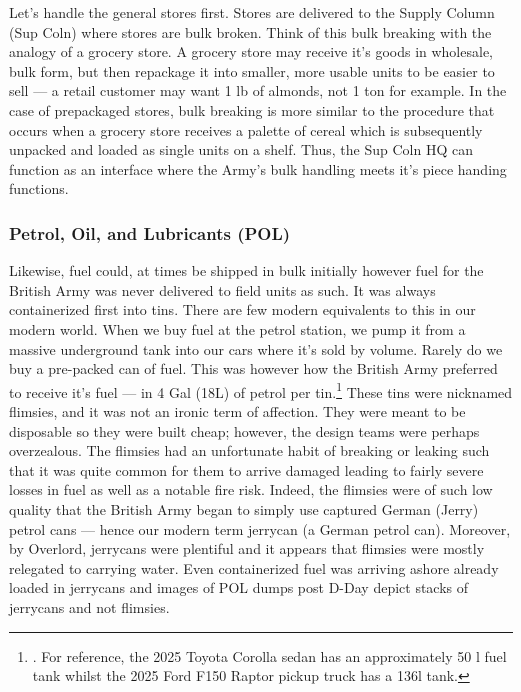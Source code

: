 \documentclass[noraggedright]{turabian-researchpaper}
\newcommand{\Petrol}{Precis of Lecture No. 12:  Petrol}
\newcommand{\SupInWar}{Precis on Lecture ``Supplies in War'', (Part II)}
\begin{document}
Let's handle the general stores first.  Stores are delivered to the Supply
Column (Sup Coln) where stores are bulk broken.  Think of this bulk breaking 
with the analogy of a grocery store.  A grocery store may receive it's goods in 
wholesale, bulk form, but then repackage it into smaller, more usable units to
be easier to sell --- a retail customer may want 1 lb of almonds, not 1 ton
for example.  In the case of prepackaged stores, bulk breaking is more similar
to the procedure that occurs when a grocery store receives a palette of cereal
which is subsequently unpacked and loaded as single units on a shelf.  Thus,
the Sup Coln HQ can function as an interface where the Army's bulk handling 
meets it's piece handing functions.\autocite[\SupInWar][3]{27course}

\subsubsection{Petrol, Oil, and Lubricants (POL)}

Likewise, fuel could, at times be shipped in bulk initially however fuel for
the British Army was never delivered to field units as such.  It was always
containerized first into tins.  There are few modern equivalents to this in
our modern world.  When we buy fuel at the petrol station, we pump it from a 
massive underground tank into our cars where it's sold by volume.  Rarely do
we buy a pre-packed can of fuel.  This was however how the British Army 
preferred to receive it's fuel --- in 4 Gal (18L) of petrol per tin.\footnote
{\cite[\Petrol][3]{27course}.
For reference, the 2025 Toyota Corolla sedan has an approximately 50 l fuel 
tank whilst the 2025 Ford F150 Raptor pickup truck has a 136l tank.}%
These tins were nicknamed flimsies, and it was not an ironic term of affection. 
They were meant to be disposable so they were built cheap; however, the 
design teams were perhaps overzealous.  The flimsies had an unfortunate habit
of breaking or leaking such that it was quite common for them to arrive 
damaged leading to fairly severe losses in fuel as well as a notable fire risk.  
Indeed, the flimsies were of such low quality that the British Army began to 
simply use captured German (Jerry) petrol cans --- hence our modern term 
jerrycan (a German petrol can).  Moreover, by Overlord, jerrycans were 
plentiful and it appears that flimsies were mostly relegated to carrying 
water.  Even containerized fuel was arriving ashore already loaded in
jerrycans and images of POL dumps post D-Day depict stacks of jerrycans and
not flimsies.\autocite[8:30 -- 10:55]{buildup}
\end{document}
